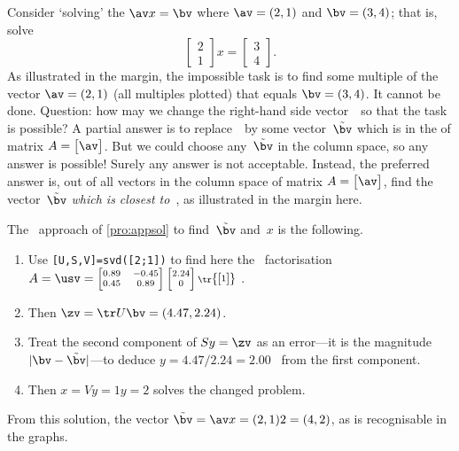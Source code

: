 \begin{example} \label{eg:incon1}
Consider `solving' the  \(\av x=\bv\) where \(\av=(2,1)\) and \(\bv=(3,4)\); that is, solve
\begin{equation*}
\begin{bmatrix} 2\\1 \end{bmatrix}x=\begin{bmatrix} 3\\4 \end{bmatrix}.
\end{equation*}
%
As illustrated in the margin, the impossible task is to find some multiple of the vector \(\av=(2,1)\) (all multiples plotted) that equals \(\bv=(3,4)\).
It cannot be done.
Question: how may we change the right-hand side vector~\bv\ so that the task is possible?  
A partial answer is to replace~\bv\ by some vector~\(\tilde\bv\) which is in the  of matrix \(A=\begin{bmatrix} \av \end{bmatrix}\).
But we could choose any~\(\tilde\bv\) in the column space, so any answer is possible! Surely any answer is not acceptable.
%
Instead, the preferred answer is, out of all vectors in the column space of matrix \(A=\begin{bmatrix} \av \end{bmatrix}\),  find the vector~\(\tilde\bv\)  \emph{which is closest to}~\bv, as illustrated in the margin here.

The \svd\ approach of \autoref{pro:appsol} to find~\(\tilde\bv\) and~\(x\) is the following.
\begin{enumerate}
\item Use \verb|[U,S,V]=svd([2;1])| to find here the \svd\ factorisation \(A=\usv=\scriptsize\begin{bmatrix} 0.89&-0.45\\0.45&0.89 \end{bmatrix} \begin{bmatrix} 2.24\\0 \end{bmatrix}\tr{\begin{bmatrix} 1 \end{bmatrix}}\) \twodp.
\item Then \(\zv=\tr U\bv=(4.47,2.24)\).
\item Treat the second component of \(Sy=\zv\) as an error---it is the magnitude \(|\bv-\tilde\bv|\)---to deduce \(y=4.47/2.24=2.00\) \twodp\ from the first component.
\item Then  \(x=Vy=1y=2\) solves the changed problem.
\end{enumerate}
From this solution, the vector \(\tilde\bv=\av x=(2,1)2=(4,2)\), as is recognisable in the graphs.
\end{example}

